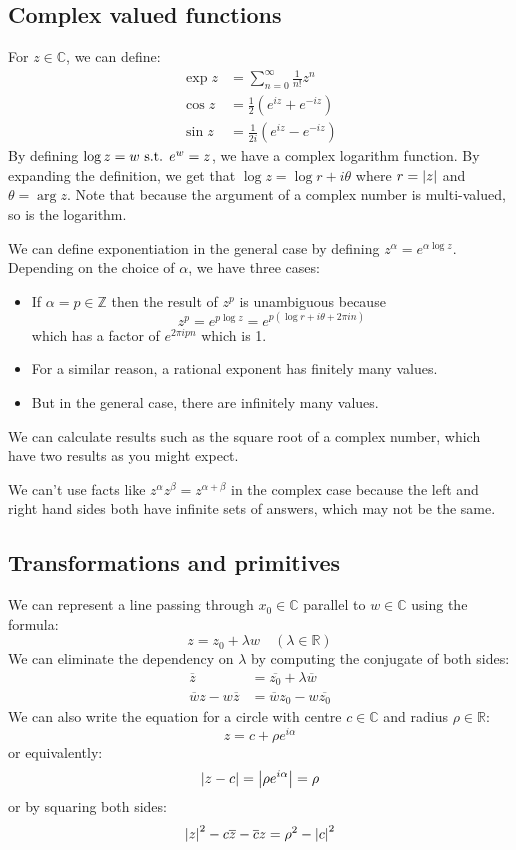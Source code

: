 \subsection{Complex valued functions}
For \(z \in \mathbb C\), we can define:
\begin{align*}
	\exp z & = \sum_{n=0}^{\infty} \frac{1}{n!}z^n          \\
	\cos z & = \frac{1}{2} \left( e^{iz} + e^{-iz} \right)  \\
	\sin z & = \frac{1}{2i} \left( e^{iz} - e^{-iz} \right)
\end{align*}
By defining \(\log z = w \text{ s.t. } e^w = z\), we have a complex logarithm function.
By expanding the definition, we get that \(\log z = \log r + i\theta\) where \(r = \abs{z}\) and \(\theta = \arg{z}\).
Note that because the argument of a complex number is multi-valued, so is the logarithm.

We can define exponentiation in the general case by defining \(z^\alpha = e^{\alpha \log z}\).
Depending on the choice of \(\alpha\), we have three cases:
\begin{itemize}
	\item If \(\alpha = p \in \mathbb Z\) then the result of \(z^p\) is unambiguous because
	      \[
		      z^p = e^{p \log z} = e^{p (\log r + i \theta + 2 \pi i n)}
	      \]
	      which has a factor of \(e^{2 \pi i p n}\) which is 1.
	\item For a similar reason, a rational exponent has finitely many values.
	\item But in the general case, there are infinitely many values.
\end{itemize}
We can calculate results such as the square root of a complex number, which have two results as you might expect.

\begin{note}
	We can't use facts like \(z^\alpha z^\beta = z^{\alpha + \beta}\) in the complex case because the left and right hand sides both have infinite sets of answers, which may not be the same.
\end{note}

\subsection{Transformations and primitives}
We can represent a line passing through \(x_0\in \mathbb C\) parallel to \(w \in \mathbb C\) using the formula:
\[
	z = z_0 + \lambda w\quad(\lambda \in \mathbb R)
\]
We can eliminate the dependency on \(\lambda\) by computing the conjugate of both sides:
\begin{align*}
	\overline{z}                  & = \overline{z_0} + \lambda \overline{w} \\
	\overline{w}z - w\overline{z} & = \overline{w}z_0 - w\overline{z_0}
\end{align*} %
We can also write the equation for a circle with centre \(c \in \mathbb C\) and radius \(\rho \in \mathbb R\):
\[
	z = c + \rho e^{i\alpha}
\]
or equivalently:
\[
	\abs{z - c} = \abs{\rho e^{i\alpha}} = \rho
\]
or by squaring both sides:
\[
	\abs{z}^2 - c\overline{z} - \overline{c}z = \rho^2 - \abs{c}^2
\]
